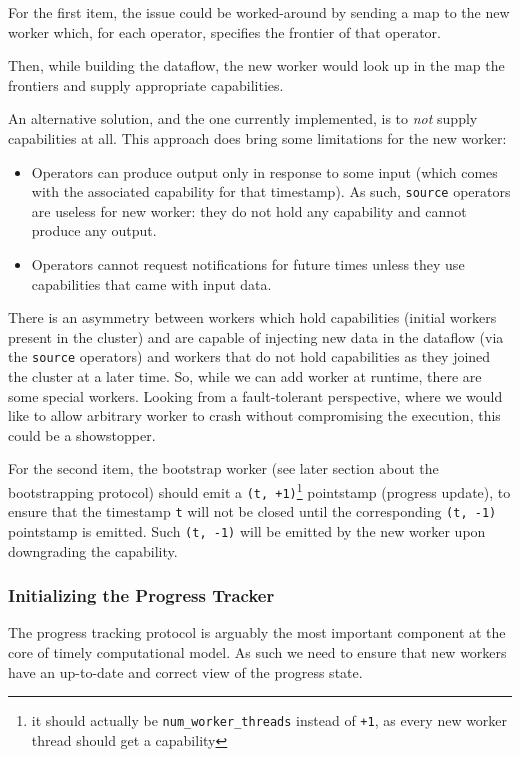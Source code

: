 \documentclass[12pt]{extarticle}
\begin{document}
For the first item, the issue could be worked-around by sending a map to the new
worker which, for each operator, specifies the frontier of that operator.

Then, while building the dataflow, the new worker would look up in the map the frontiers
and supply appropriate capabilities.

An alternative solution, and the one currently implemented, is to \textit{not} supply capabilities at all.
This approach does bring some limitations for the new worker:
\begin{itemize}
    \item Operators can produce output only in response to some input (which comes with the associated capability for that timestamp).
        As such, \verb|source| operators are useless for new worker: they do not hold any capability and cannot produce any output.
    \item Operators cannot request notifications for future times unless they use capabilities that came with input data.
\end{itemize}

There is an asymmetry between workers which hold capabilities (initial workers present in the cluster)
and are capable of injecting new data in the dataflow (via the \verb|source| operators) and workers
that do not hold capabilities as they joined the cluster at a later time. So, while we can add worker
at runtime, there are some special workers.
Looking from a fault-tolerant perspective, where we would like to allow arbitrary worker to crash without
compromising the execution, this could be a showstopper.

\vspace{3mm}
For the second item, the bootstrap worker (see later section about the bootstrapping protocol)
should emit a \verb|(t, +1)|\footnote{it should actually be \verb|num_worker_threads| instead of \verb|+1|, as every new worker thread should get a capability}
pointstamp (progress update), to ensure that the timestamp \verb|t| will not be closed
until the corresponding \verb|(t, -1)| pointstamp is emitted.
Such \verb|(t, -1)| will be emitted by the new worker upon downgrading the capability.

\subsubsection{Initializing the Progress Tracker}
The progress tracking protocol is arguably the most important component at the core of timely computational model.
As such we need to ensure that new workers have an up-to-date and correct view of the progress state.
\end{document}

